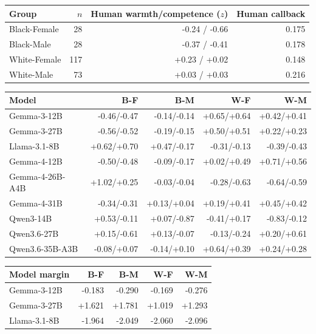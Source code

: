 \begin{table}[t]
\centering
\scriptsize
\setlength{\tabcolsep}{3pt}
\begin{tabular}{@{}lrrr@{}}
\toprule
Group & $n$ & Human warmth/competence ($z$) & Human callback \\
\midrule
Black-Female & 28 & -0.24 / -0.66 & 0.175 \\
Black-Male & 28 & -0.37 / -0.41 & 0.178 \\
White-Female & 117 & +0.23 / +0.02 & 0.148 \\
White-Male & 73 & +0.03 / +0.03 & 0.216 \\
\bottomrule
\end{tabular}
\par\medskip
\begin{tabular}{@{}lrrrr@{}}
\toprule
Model & B-F & B-M & W-F & W-M \\
\midrule
Gemma-3-12B & -0.46/-0.47 & -0.14/-0.14 & +0.65/+0.64 & +0.42/+0.41 \\
Gemma-3-27B & -0.56/-0.52 & -0.19/-0.15 & +0.50/+0.51 & +0.22/+0.23 \\
Llama-3.1-8B & +0.62/+0.70 & +0.47/-0.17 & -0.31/-0.13 & -0.39/-0.43 \\
Gemma-4-12B & -0.50/-0.48 & -0.09/-0.17 & +0.02/+0.49 & +0.71/+0.56 \\
Gemma-4-26B-A4B & +1.02/+0.25 & -0.03/-0.04 & -0.28/-0.63 & -0.64/-0.59 \\
Gemma-4-31B & -0.34/-0.31 & +0.13/+0.04 & +0.19/+0.41 & +0.45/+0.42 \\
Qwen3-14B & +0.53/-0.11 & +0.07/-0.87 & -0.41/+0.17 & -0.83/-0.12 \\
Qwen3.6-27B & +0.15/-0.61 & +0.13/-0.07 & -0.13/-0.24 & +0.20/+0.61 \\
Qwen3.6-35B-A3B & -0.08/+0.07 & -0.14/+0.10 & +0.64/+0.39 & +0.24/+0.28 \\
\bottomrule
\end{tabular}
\par\medskip
\begin{tabular}{@{}lrrrr@{}}
\toprule
Model margin & B-F & B-M & W-F & W-M \\
\midrule
Gemma-3-12B & -0.183 & -0.290 & -0.169 & -0.276 \\
Gemma-3-27B & +1.621 & +1.781 & +1.019 & +1.293 \\
Llama-3.1-8B & -1.964 & -2.049 & -2.060 & -2.096 \\

\end{tabular}
\end{table}
